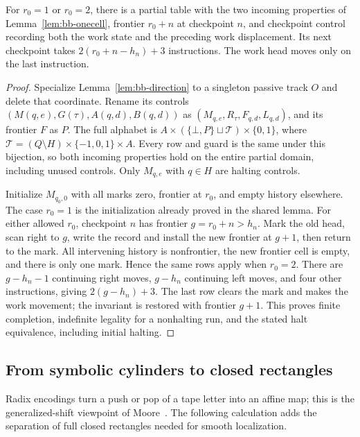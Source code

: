 \begin{lemma}\label{ba:six-compiler}
For $r_0=1$ or $r_0=2$, there is a partial table with the two incoming
properties of Lemma~\ref{lem:bb-onecell}, frontier $r_0+n$ at checkpoint
$n$, and checkpoint control recording both the work state and the
preceding work displacement.  Its next checkpoint takes
$2(r_0+n-h_n)+3$ instructions.  The work head moves only on the last
instruction.
\end{lemma}
\begin{proof}\label{ba:six-proof}
Specialize Lemma~\ref{lem:bb-direction} to a singleton passive track
$O$ and delete that coordinate.  Rename its controls
$(M(q,e),G(\tau),A(q,d),B(q,d))$ as
$(M_{q,e},R_\tau,F_{q,d},L_{q,d})$, and its frontier $F$ as $P$.
The full alphabet is
$A\times(\{\bot,P\}\sqcup\mathcal T)\times\{0,1\}$,
where $\mathcal T=(Q\setminus H)\times\{-1,0,1\}\times A$.
Every row and guard is the same under this bijection, so both incoming
properties hold on the entire partial domain, including unused controls.
Only $M_{q,e}$ with $q\in H$ are halting controls.

Initialize $M_{q_0,0}$ with all marks zero, frontier at $r_0$, and
empty history elsewhere.  The case $r_0=1$ is the initialization already
proved in the shared lemma.  For either allowed $r_0$, checkpoint $n$
has frontier $g=r_0+n>h_n$.  Mark the old head, scan right to $g$,
write the record and install the new frontier at $g+1$, then return to
the mark.  All intervening history is nonfrontier, the new frontier
cell is empty, and there is only one mark.  Hence the same rows apply
when $r_0=2$.  There are $g-h_n-1$ continuing right moves,
$g-h_n$ continuing left moves, and four other instructions, giving
$2(g-h_n)+3$.  The last row clears the mark and makes the work
movement; the invariant is restored with frontier $g+1$.  This proves
finite completion, indefinite legality for a nonhalting run, and the
stated halt equivalence, including initial halting.
\end{proof}

\subsection{From symbolic cylinders to closed rectangles}

Radix encodings turn a push or pop of a tape letter into an affine map;
this is the generalized-shift viewpoint of
Moore~\cite{Moore1990,Moore1991}.  The following calculation adds the
separation of full closed rectangles needed for smooth localization.

